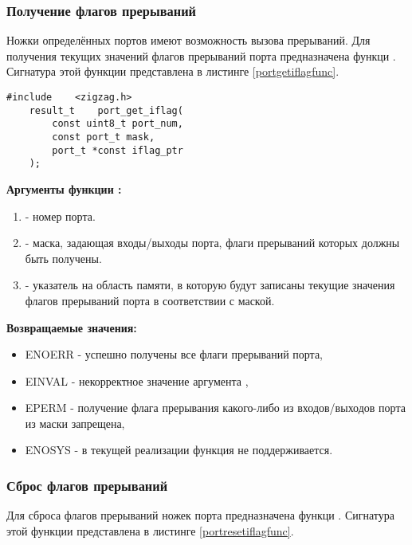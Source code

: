 \subsubsection{Получение флагов прерываний}
    Ножки определённых портов имеют возможность вызова прерываний. Для получения текущих
значений флагов прерываний порта предназначена функци .
Сигнатура этой функции представлена в листинге \ref{portgetiflagfunc}.

\begin{lstlisting}[caption=\myarg{port\_get\_iflag()} - получение флагов прерывний, label=portgetiflagfunc ]
    #include    <zigzag.h>
    result_t    port_get_iflag( 
        const uint8_t port_num, 
        const port_t mask, 
        port_t *const iflag_ptr 
    );
\end{lstlisting}

{\bfseries Аргументы функции :}

{\itshape
\begin{enumerate}
\item {} - номер порта.
\item {} - маска, задающая входы/выходы порта, флаги прерываний которых должны быть получены.
\item {} - указатель на область памяти, в которую будут записаны текущие значения флагов прерываний
порта в соответствии с маской.
\end{enumerate}
}

{\bfseries Возвращаемые значения:}

{\itshape
\begin{itemize}
\item ENOERR - успешно получены все флаги прерываний порта,
\item EINVAL - некорректное значение аргумента ,
\item EPERM - получение флага прерывания какого-либо из входов/выходов порта из маски запрещена,
\item ENOSYS - в текущей реализации функция не поддерживается.
\end{itemize}
}

\subsubsection{Сброс флагов прерываний}
    Для сброса флагов прерываний ножек порта предназначена функци .
Сигнатура этой функции представлена в листинге \ref{portresetiflagfunc}.

